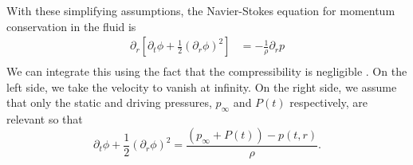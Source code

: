 \documentclass[11pt,prb,aps,nofootinbib,superscriptaddress,floatfix]{revtex4-2}
\begin{document}
With these simplifying assumptions, the Navier-Stokes equation for momentum conservation in the fluid is \cite{prosperetti1999old,prosperetti1986bubble,leighton2007derivation,brennen2014cavitation}
\begin{equation}
\begin{split}
     \partial_r \left[ \partial_t \phi +\frac{1}{2} \left( \partial_r \phi \right)^2 \right] & = - \frac{1}{\rho} \partial_r p  \\ 
     \label{eq:NS_1D}
\end{split}
\end{equation}
We can integrate this using the fact that the compressibility is negligible \cite{leighton2007derivation}. On the left side, we take the velocity to vanish at infinity. On the right side, we assume that only the static and driving pressures, $p_\infty$ and $P(t)$ respectively, are relevant so that \cite{prosperetti1999old,prosperetti1986bubble,leighton2007derivation} 
\begin{equation}
    \partial_t \phi + \frac{1}{2}\left( \partial_r \phi \right)^2 = \frac{(p_\infty+P(t))-p(t,r)}{\rho}.
    \label{eq:press_vel}
\end{equation}
\end{document}
